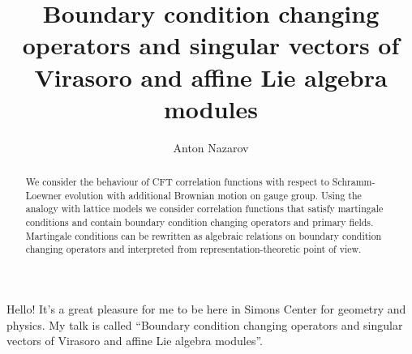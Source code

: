 \documentclass[a4paper]{article}
\title{Boundary condition changing operators and singular vectors of Virasoro and
affine Lie algebra modules}
\author{Anton Nazarov}
\begin{document}
\maketitle
\begin{abstract}
We consider the behaviour of CFT correlation functions with respect to
Schramm-Loewner evolution with additional Brownian motion on gauge
group. Using the analogy with lattice models we consider
correlation functions that satisfy martingale conditions and contain
boundary condition changing operators and primary fields.
Martingale conditions can be rewritten as algebraic relations on
boundary condition changing operators and interpreted from
representation-theoretic point of view.
\end{abstract}

Hello!
It's a great pleasure for me to be here in Simons Center for geometry and physics. 
My talk is called ``Boundary condition changing operators and singular vectors of Virasoro and
affine Lie algebra modules''. 
\end{document}

